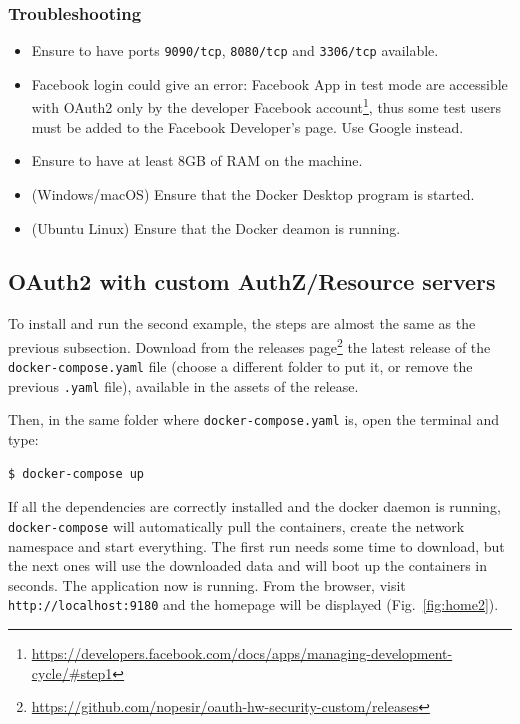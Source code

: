 \subsubsection{Troubleshooting}
\begin{itemize}
    \item Ensure to have ports \texttt{9090/tcp}, \texttt{8080/tcp} and \texttt{3306/tcp} available.
    \item Facebook login could give an error: Facebook App in test mode are accessible with OAuth2 only by the developer Facebook account\footnote{\url{https://developers.facebook.com/docs/apps/managing-development-cycle/\#step1}}, thus some test users must be added to the Facebook Developer's page. Use Google instead.
    \item Ensure to have at least 8GB of RAM on the machine.
    \item (Windows/macOS) Ensure that the Docker Desktop program is started.
    \item (Ubuntu Linux) Ensure that the Docker deamon is running.
\end{itemize}

\newpage

\subsection{OAuth2 with custom AuthZ/Resource servers}
To install and run the second example, the steps are almost the same as the previous subsection. Download from the releases page\footnote{\url{https://github.com/nopesir/oauth-hw-security-custom/releases}} the latest release of the \texttt{docker-compose.yaml} file (choose a different folder to put it, or remove the previous \texttt{.yaml} file), available in the assets of the release.

\noindent Then, in the same folder where \texttt{docker-compose.yaml} is, open the terminal and type:
\begin{lstlisting}[language=bash]
  $ docker-compose up
\end{lstlisting}

\noindent If all the dependencies are correctly installed and the docker daemon is running, \texttt{docker-compose} will automatically pull the containers, create the network namespace and start everything. 
The first run needs some time to download, but the next ones will use the downloaded data and will boot up the containers in seconds. The application now is running. From the browser, visit \texttt{http://localhost:9180} and the homepage will be displayed (Fig.~\ref{fig:home2}).

